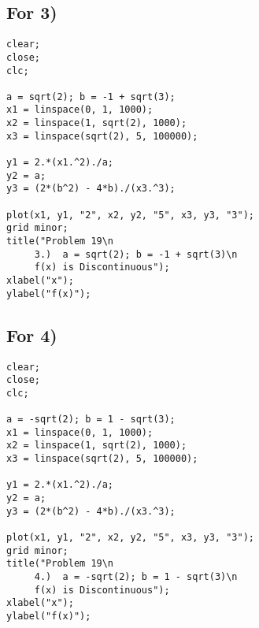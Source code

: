 \subsection{For 3)}
\begin{lstlisting}[frame = single]
clear;
close;
clc;

a = sqrt(2); b = -1 + sqrt(3);
x1 = linspace(0, 1, 1000);
x2 = linspace(1, sqrt(2), 1000);
x3 = linspace(sqrt(2), 5, 100000);

y1 = 2.*(x1.^2)./a;
y2 = a;
y3 = (2*(b^2) - 4*b)./(x3.^3);

plot(x1, y1, "2", x2, y2, "5", x3, y3, "3");
grid minor;
title("Problem 19\n 
     3.)  a = sqrt(2); b = -1 + sqrt(3)\n
     f(x) is Discontinuous");
xlabel("x");
ylabel("f(x)");
\end{lstlisting}
\subsection{For 4)}
\begin{lstlisting}[frame = single]
clear;
close;
clc;

a = -sqrt(2); b = 1 - sqrt(3);
x1 = linspace(0, 1, 1000);
x2 = linspace(1, sqrt(2), 1000);
x3 = linspace(sqrt(2), 5, 100000);

y1 = 2.*(x1.^2)./a;
y2 = a;
y3 = (2*(b^2) - 4*b)./(x3.^3);

plot(x1, y1, "2", x2, y2, "5", x3, y3, "3");
grid minor;
title("Problem 19\n 
     4.)  a = -sqrt(2); b = 1 - sqrt(3)\n
     f(x) is Discontinuous");
xlabel("x");
ylabel("f(x)");
\end{lstlisting}
%
